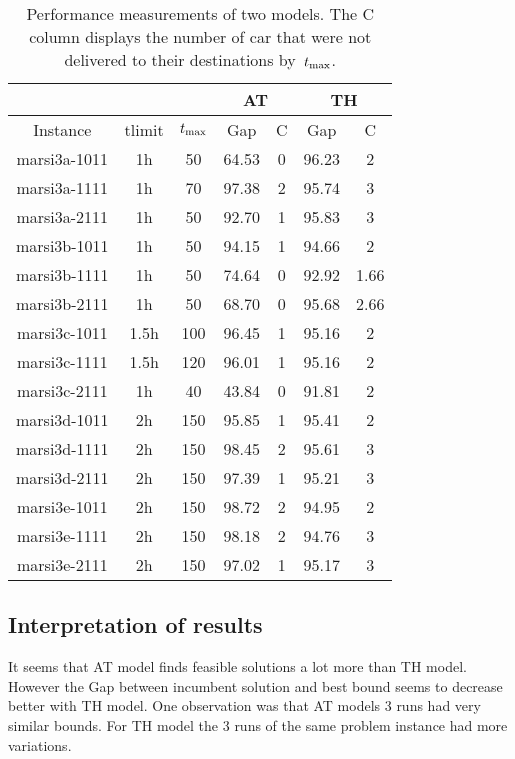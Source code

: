 \begin{table}[h]
    \begin{center}
        \begin{tabular}{|c|c|c|c|c|c|c|}
            \cline{4-7}
            \multicolumn{3}{l}{\ } & \multicolumn{2}{|c|}{AT} &
            \multicolumn{2}{|c|}{TH}\\
            \hline
            Instance & tlimit & $t_{\max}$ & Gap & C & Gap & C\\
            \hline
            marsi3a-1011 & 1h & 50 & 64.53 & 0 & 96.23 & 2\\
            marsi3a-1111 & 1h & 70 & 97.38 & 2 & 95.74 & 3\\
            marsi3a-2111 & 1h & 50 & 92.70 & 1 & 95.83 & 3\\
            marsi3b-1011 & 1h & 50 & 94.15 & 1 & 94.66 & 2\\
            marsi3b-1111 & 1h & 50 & 74.64 & 0 & 92.92 & 1.66\\
            marsi3b-2111 & 1h & 50 & 68.70 & 0 & 95.68 & 2.66\\
            marsi3c-1011 & 1.5h & 100 & 96.45 & 1 & 95.16 & 2\\
            marsi3c-1111 & 1.5h & 120 & 96.01 & 1 & 95.16 & 2\\
            marsi3c-2111 & 1h & 40 & 43.84 & 0 & 91.81 & 2\\
            marsi3d-1011 & 2h & 150 & 95.85 & 1 & 95.41 & 2\\
            marsi3d-1111 & 2h & 150 & 98.45 & 2 & 95.61 & 3\\
            marsi3d-2111 & 2h & 150 & 97.39 & 1 & 95.21 & 3\\
            marsi3e-1011 & 2h & 150 & 98.72 & 2 & 94.95 & 2\\
            marsi3e-1111 & 2h & 150 & 98.18 & 2 & 94.76 & 3\\
            marsi3e-2111 & 2h & 150 & 97.02 & 1 & 95.17 & 3\\
            \hline
        \end{tabular}
        \caption{Performance measurements of two models. The C column displays
            the number of car that were not delivered to their destinations
        by~$t_{\max}$.}
        \label{tbl:compare}
    \end{center}
\end{table}

\subsection{Interpretation of results}
It seems that AT model finds feasible solutions a lot more than TH model.
However the Gap between incumbent solution and best bound seems to decrease
better with TH model. One observation was that AT models 3 runs had very
similar bounds. For TH model the 3 runs of the same problem instance had more
variations.

